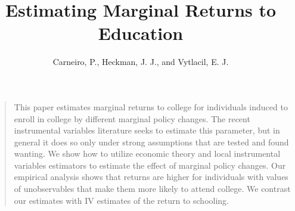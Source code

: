 

\title{Estimating Marginal Returns to Education}
\author{Carneiro, P., Heckman, J. J., and Vytlacil, E. J.}

\date{}

\let\otp\titlepage


\nobibliography*
\maketitle

 \begin{frame}
\begin{quote} This paper estimates marginal returns to college for individuals induced to enroll in college by different marginal policy changes. The recent instrumental variables literature seeks to estimate this parameter, but in general it does so only under strong assumptions that are tested and found wanting. We show how to utilize economic theory and local instrumental variables estimators to estimate the effect of marginal policy changes. Our empirical analysis shows that returns are higher for individuals with values of unobservables that make them more likely to attend college. We contrast our estimates with IV estimates of the return to schooling.
\end{quote}
 \end{frame}


\begin{frame}\begin{center}\begin{figure}[htp]\centering
{}
\end{figure}\end{center}\end{frame}

\begin{frame}\begin{center}\begin{figure}[htp]\centering
{}
\end{figure}\end{center}\end{frame}

\begin{frame}\begin{center}\begin{figure}[htp]\centering
{}
\end{figure}\end{center}\end{frame}


